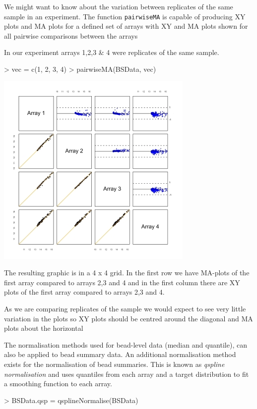 \documentclass[a4paper]{article}
\newcommand{\Rfunction}[1]{{\texttt{#1}}}
\begin{document}
We might want to know about the variation between replicates of the same sample in an experiment. The function \Rfunction{pairwiseMA} is capable of producing XY plots and MA plots for a defined set of arrays with XY and MA plots shown for all pairwise comparisons between the arrays

In our experiment arrays 1,2,3 \& 4 were replicates of the same sample.

\begin{center}
\begin{Schunk}
\begin{Sinput}
> vec = c(1, 2, 3, 4)
> pairwiseMA(BSData, vec)
\end{Sinput}
\end{Schunk}

\includegraphics{pairwise2.jpg}

\end{center}

The resulting graphic is in a 4 x 4 grid. In the first row we have MA-plots of the first array compared to arrays 2,3 and 4 and in the first column there are XY plots of the first array compared to arrays 2,3 and 4. 

As we are comparing replicates of the sample we would expect to see very little variation in the plots so XY plots should be centred around the diagonal and MA plots about the horizontal

The normalisation methods used for bead-level data (median and quantile), can also be applied to bead summary data. An additional normalisation method exists for the normalisation of bead summaries. This is known as \emph{qspline normalisation} and uses quantiles from each array and a target distribution to fit a smoothing function to each array. 

\begin{Schunk}
\begin{Sinput}
> BSData.qsp = qsplineNormalise(BSData)
\end{Sinput}
\end{Schunk}
\end{document}
